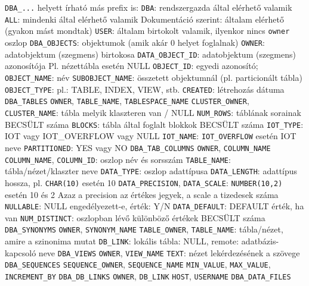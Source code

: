 \documentclass[12pt,a4paper]{article}
\begin{document}
\begin{outline}
	\1 \texttt{DBA\_...} helyett írható más prefix is:
		\2 \texttt{DBA}: rendszergazda által elérhető valamik
		\2 \texttt{ALL}: mindenki által elérhető valamik
			\3 Dokumentáció szerint: általam elérhető (gyakon mást mondtak)
		\2 \texttt{USER}: általam birtokolt valamik, ilyenkor nincs \texttt{owner} oszlop
	\1 \texttt{DBA\_OBJECTS}: objektumok (amik akár 0 helyet foglalnak)
		\2 \texttt{OWNER}: adatobjektum (szegmens) birtokosa
		\2 \texttt{DATA\_OBJECT\_ID}: adatobjektum (szegmens) azonosítója
			\3 Pl. nézettábla esetén NULL
		\2 \texttt{OBJECT\_ID}: egyedi azonosító; \texttt{OBJECT\_NAME}: név
		\2 \texttt{SUBOBJECT\_NAME}: összetett objektumnál (pl. particionált tábla)
		\2 \texttt{OBJECT\_TYPE}: pl.: TABLE, INDEX, VIEW, stb.
		\2 \texttt{CREATED}: létrehozás dátuma
	\1 \texttt{DBA\_TABLES}
		\2 \texttt{OWNER}, \texttt{TABLE\_NAME}, \texttt{TABLESPACE\_NAME}
		\2 \texttt{CLUSTER\_OWNER}, \texttt{CLUSTER\_NAME}: tábla melyik klaszteren van / NULL
		\2 \texttt{NUM\_ROWS}: táblának sorainak BECSÜLT száma
		\2 \texttt{BLOCKS}: tábla által foglalt blokkok BECSÜLT száma
		\2 \texttt{IOT\_TYPE}: IOT vagy IOT\_OVERFLOW vagy NULL
		\2 \texttt{IOT\_NAME}: \texttt{IOT\_OVERFLOW} esetén IOT neve
		\2 \texttt{PARTITIONED}: YES vagy NO
\pagebreak
	\1 \texttt{DBA\_TAB\_COLUMNS}
		\2 \texttt{OWNER}, \texttt{COLUMN\_NAME}
		\2 \texttt{COLUMN\_NAME}, \texttt{COLUMN\_ID}: oszlop név és sorsszám
		\2 \texttt{TABLE\_NAME}: tábla/nézet/klaszter neve
		\2 \texttt{DATA\_TYPE}: oszlop adattípusa
		\2 \texttt{DATA\_LENGTH}: adattípus hossza, pl. \texttt{CHAR(10)} esetén 10
		\2 \texttt{DATA\_PRECISION}, \texttt{DATA\_SCALE}: \texttt{NUMBER(10,2)} esetén 10 és 2
			\3 Azaz a precision az értékes jegyek, a scale a tizedesek száma
		\2 \texttt{NULLABLE}: NULL engedélyezett-e, érték: Y/N
		\2 \texttt{DATA\_DEFAULT}: DEFAULT érték, ha van
		\2 \texttt{NUM\_DISTINCT}: oszlopban lévő különböző értékek BECSÜLT száma
	\1 \texttt{DBA\_SYNONYMS}
		\2 \texttt{OWNER}, \texttt{SYNONYM\_NAME}
		\2 \texttt{TABLE\_OWNER}, \texttt{TABLE\_NAME}: tábla/nézet, amire a szinonima mutat
		\2 \texttt{DB\_LINK}: lokális tábla: NULL, remote: adatbázis-kapcsoló neve
	\1 \texttt{DBA\_VIEWS}
		\2 \texttt{OWNER}, \texttt{VIEW\_NAME}
		\2 \texttt{TEXT}: nézet lekérdezésének a szövege
	\1 \texttt{DBA\_SEQUENCES}
		\2 \texttt{SEQUENCE\_OWNER}, \texttt{SEQUENCE\_NAME}
		\2 \texttt{MIN\_VALUE}, \texttt{MAX\_VALUE}, \texttt{INCREMENT\_BY}
	\1 \texttt{DBA\_DB\_LINKS}
		\2 \texttt{OWNER}, \texttt{DB\_LINK}
		\2 \texttt{HOST}, \texttt{USERNAME}
\pagebreak
	\1 \texttt{DBA\_DATA\_FILES}

\end{outline}
\end{document}
